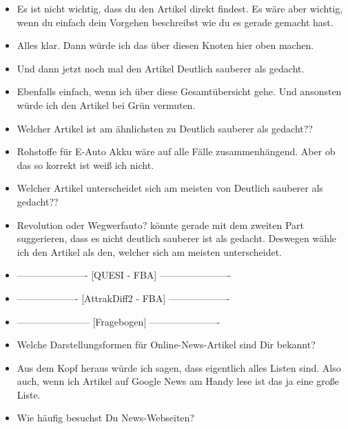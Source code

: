 {\begin{itemize}[]
                  Aber ist in diesem Test gefordert, dass ich den Artikel direkt finden muss?
                  Weil dann würde ich einfach oben auf den Knoten mit der 13 klicken.
            \item {} Es ist nicht wichtig, dass du den Artikel direkt findest.
                  Es wäre aber wichtig, wenn du einfach dein Vorgehen beschreibst wie du es gerade gemacht hast.
            \item {} Alles klar. Dann würde ich das über diesen Knoten hier oben machen.
            \item {} Und dann jetzt noch mal den Artikel \flqq Deutlich sauberer als gedacht\frqq{}.
            \item {} Ebenfalls einfach, wenn ich über diese Gesamtübersicht gehe.
                  Und ansonsten würde ich den Artikel bei Grün vermuten.
            \item {} Welcher Artikel ist am ähnlichsten zu \flqq Deutlich sauberer als gedacht?\frqq{}?
            \item {} \flqq Rohstoffe für E-Auto Akku\frqq{} wäre auf alle Fälle zusammenhängend.
                  Aber ob das so korrekt ist weiß ich nicht.
            \item {} Welcher Artikel unterscheidet sich am meisten von \flqq Deutlich sauberer als gedacht?\frqq{}?
            \item {} \flqq Revolution oder Wegwerfauto?\frqq{} könnte gerade mit dem zweiten Part suggerieren, dass es nicht deutlich sauberer ist als gedacht.
                  Deswegen wähle ich den Artikel als den, welcher sich am meisten unterscheidet.
            \item {----------------------} [QUESI - FBA] {----------------------}
            \item {-------------------} [AttrakDiff2 - FBA] {-------------------}
            \item {-----------------------} [Fragebogen] {----------------------}
            \item {} Welche Darstellungsformen für Online-News-Artikel sind Dir bekannt?
            \item {} Aus dem Kopf heraus würde ich sagen, dass eigentlich alles Listen sind.
                  Also auch, wenn ich Artikel auf Google News am Handy lese ist das ja eine große Liste.
            \item {} Wie häufig besuchst Du News-Webseiten?

\end{itemize}}
